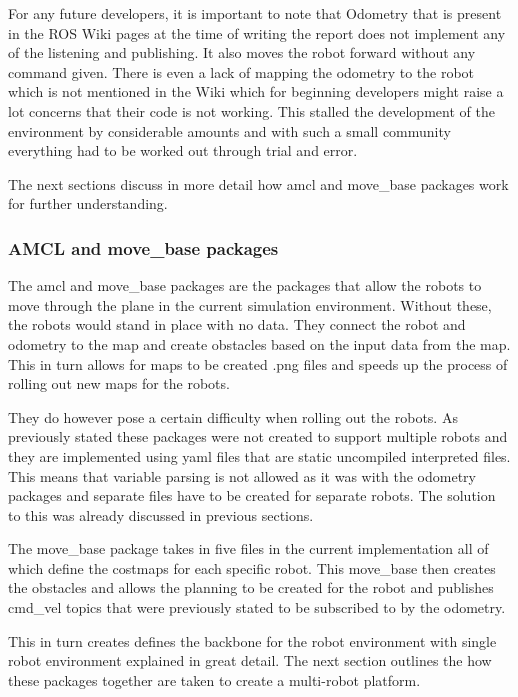       For any future developers, it is important to note that Odometry that is present in the ROS Wiki pages at the time of writing the report does not implement any of the listening and publishing. It also moves the robot forward without any command given. There is even a lack of mapping the odometry to the robot which is not mentioned in the Wiki which for beginning developers might raise a lot concerns that their code is not working. This stalled the development of the environment by considerable amounts and with such a small community everything had to be worked out through trial and error.

      The next sections discuss in more detail how amcl and move\_base packages work for further understanding.

    \subsubsection{AMCL and move\_base packages}
      The amcl and move\_base packages are the packages that allow the robots to move through the plane in the current simulation environment. Without these, the robots would stand in place with no data. They connect the robot and odometry to the map and create obstacles based on the input data from the map. This in turn allows for maps to be created .png files and speeds up the process of rolling out new maps for the robots.

      They do however pose a certain difficulty when rolling out the robots. As previously stated these packages were not created to support multiple robots and they are implemented using yaml files that are static uncompiled interpreted files. This means that variable parsing is not allowed as it was with the odometry packages and separate files have to be created for separate robots. The solution to this was already discussed in previous sections.

      The move\_base package takes in five files in the current implementation all of which define the costmaps for each specific robot. This move\_base then creates the obstacles and allows the planning to be created for the robot and publishes cmd\_vel topics that were previously stated to be subscribed to by the odometry.

      This in turn creates defines the backbone for the robot environment with single robot environment explained in great detail. The next section outlines the how these packages together are taken to create a multi-robot platform.

